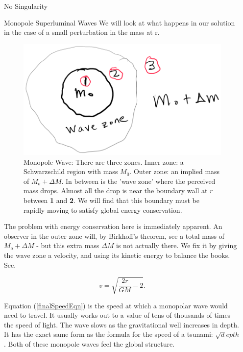 \documentclass[final]{beamer}
\newlength{\sepwidth}
\newlength{\colwidth}
\newcommand{\separatorcolumn}{\begin{column}{\sepwidth}\end{column}}
\begin{document}
\begin{frame}[t]
\begin{columns}[t]
\begin{column}{\colwidth}
\begin{exampleblock}{No Singularity}
\end{exampleblock}

\begin{block}{Monopole Superluminal Waves}
	We will look at what happens in our solution in the case of a small perturbation in the mass at r. 
\begin{figure}
\includegraphics[width=0.45\columnwidth]{monopole.png}
\caption{Monopole Wave: There are three zones. Inner zone: a Schwarzschild region with mass $M_0$. Outer zone: an implied mass of $M_o + \Delta M$. In between is the 'wave zone' where the perceived mass drops. Almost all the drop is near the boundary wall at $r$ between \textbf{1} and \textbf{2}. We will find that this boundary must be rapidly moving to satisfy global energy conservation.}
\label{monopoleEnergy} 
\end{figure}

The problem with energy conservation here is immediately apparent. An observer in the outer zone will, by Birkhoff's theorem, see a total mass of $M_o + \Delta M$ - but this extra mass $\Delta M$ is not actually there. We fix it by giving the wave zone a velocity, and using its kinetic energy to balance the books. See\cite{andersenEinsteinsMissingEnergy2025}.

\begin{equation} \label{finalSpeedEqn}
 v = \sqrt{\frac{2 r}{GM} - 2}.
\end{equation}

Equation (\ref{finalSpeedEqn}) is the speed at which a monopolar wave would need to travel. It usually works out to a value of tens of thousands of times the speed of light. The wave slows as the gravitational well increases in depth. It has the exact same form as the formula for the speed of a tsunami: $\sqrt depth$. Both of these monopole waves feel the global structure.
\end{block}


\end{column}
\separatorcolumn



\end{columns}
\end{frame}
\end{document}
